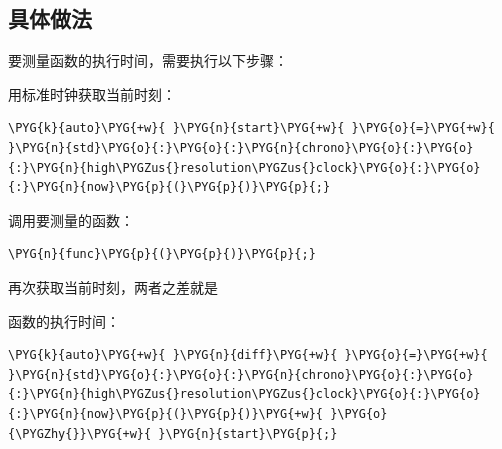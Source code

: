 \subsection{具体做法}



要测量函数的执行时间，需要执行以下步骤：



用标准时钟获取当前时刻：



\begin{codeblockbg}
\begin{Verbatim}[commandchars=\\\{\},breaklines=true,breakanywhere=true,fontsize=\codefont,xleftmargin=17bp]
\PYG{k}{auto}\PYG{+w}{ }\PYG{n}{start}\PYG{+w}{ }\PYG{o}{=}\PYG{+w}{ }\PYG{n}{std}\PYG{o}{:}\PYG{o}{:}\PYG{n}{chrono}\PYG{o}{:}\PYG{o}{:}\PYG{n}{high\PYGZus{}resolution\PYGZus{}clock}\PYG{o}{:}\PYG{o}{:}\PYG{n}{now}\PYG{p}{(}\PYG{p}{)}\PYG{p}{;}
\end{Verbatim}
\end{codeblockbg}



调用要测量的函数：



\begin{codeblockbg}
\begin{Verbatim}[commandchars=\\\{\},breaklines=true,breakanywhere=true,fontsize=\codefont,xleftmargin=17bp]
\PYG{n}{func}\PYG{p}{(}\PYG{p}{)}\PYG{p}{;}
\end{Verbatim}
\end{codeblockbg}



再次获取当前时刻，两者之差就是



函数的执行时间：



\begin{codeblockbg}
\begin{Verbatim}[commandchars=\\\{\},breaklines=true,breakanywhere=true,fontsize=\codefont,xleftmargin=17bp]
\PYG{k}{auto}\PYG{+w}{ }\PYG{n}{diff}\PYG{+w}{ }\PYG{o}{=}\PYG{+w}{ }\PYG{n}{std}\PYG{o}{:}\PYG{o}{:}\PYG{n}{chrono}\PYG{o}{:}\PYG{o}{:}\PYG{n}{high\PYGZus{}resolution\PYGZus{}clock}\PYG{o}{:}\PYG{o}{:}\PYG{n}{now}\PYG{p}{(}\PYG{p}{)}\PYG{+w}{ }\PYG{o}{\PYGZhy{}}\PYG{+w}{ }\PYG{n}{start}\PYG{p}{;}
\end{Verbatim}
\end{codeblockbg}


